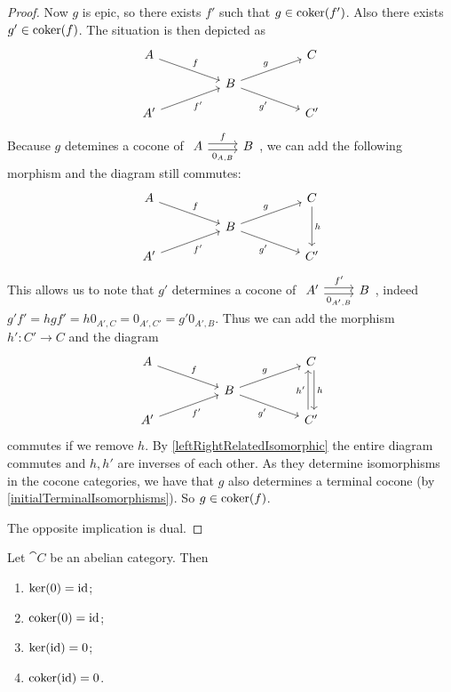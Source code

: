 \begin{proof}
Now $g$ is epic, so there exists $f'$ such that $g\in\operatorname{coker}(f')$. Also there exists $g'\in\operatorname{coker}(f)$. The situation is then depicted as
\[ \begin{tikzcd}[row sep=small, column sep=huge]
A \arrow[dr, "{f}"] & {} & C \\
{} & B \arrow[ur, "{g}"] \arrow[dr, swap, "{g'}"] & {} \\
A' \arrow[ur, swap, "{f'}"] & {} & C'
\end{tikzcd} \]
Because $g$ detemines a cocone of $\begin{tikzcd}
A \arrow[r, shift left, "f"] \arrow[r, shift right, swap, "{0_{A,B}}"] & B
\end{tikzcd}$, we can add the following morphism and the diagram still commutes:
\[ \begin{tikzcd}[row sep=small, column sep=huge]
A \arrow[dr, "{f}"] & {} & C \arrow[dd, "h"] \\
{} & B \arrow[ur, "{g}"] \arrow[dr, swap, "{g'}"] & {} \\
A' \arrow[ur, swap, "{f'}"] & {} & C'
\end{tikzcd} \]
This allows us to note that $g'$ determines a cocone of $\begin{tikzcd}
A' \arrow[r, shift left, "f'"] \arrow[r, shift right, swap, "{0_{A',B}}"] & B
\end{tikzcd}$, indeed $g'f' = hgf' = h0_{A',C} = 0_{A',C'} = g'0_{A',B}$. Thus we can add the morphism $h': C'\to C$ and the diagram
\[ \begin{tikzcd}[row sep=small, column sep=huge]
A \arrow[dr, "{f}"] & {} & C \arrow[dd, shift left, "h"] \\
{} & B \arrow[ur, "{g}"] \arrow[dr, swap, "{g'}"] & {} \\
A' \arrow[ur, swap, "{f'}"] & {} & C' \arrow[uu, shift left, "{h'}"]
\end{tikzcd} \]
commutes if we remove $h$. By \ref{leftRightRelatedIsomorphic} the entire diagram commutes and $h,h'$ are inverses of each other. As they determine isomorphisms in the cocone categories, we have that $g$ also determines a terminal cocone (by \ref{initialTerminalIsomorphisms}). So $g\in \operatorname{coker}(f)$.

The opposite implication is dual.
\end{proof}

\begin{lemma}
Let $\cat{C}$ be an abelian category. Then
\begin{enumerate}
\item $\ker(0) = \operatorname{id}$;
\item $\operatorname{coker}(0) = \operatorname{id}$;
\item $\ker(\operatorname{id}) = 0$;
\item $\operatorname{coker}(\operatorname{id}) = 0$.
\end{enumerate}
\end{lemma}

